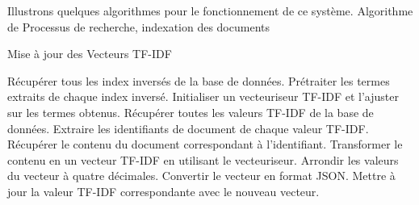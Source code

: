 Illustrons quelques algorithmes pour le fonctionnement de ce système.
Algorithme de Processus de recherche, indexation des documents

\begin{algorithm}
    \caption{Mise à jour des Vecteurs TF-IDF}
    \begin{algorithmic}[1]
        \State Récupérer tous les index inversés de la base de données.
        \State Prétraiter les termes extraits de chaque index inversé.
        \State Initialiser un vecteuriseur TF-IDF et l'ajuster sur les termes obtenus.
        \State Récupérer toutes les valeurs TF-IDF de la base de données.
        \State Extraire les identifiants de document de chaque valeur TF-IDF.
            \State Récupérer le contenu du document correspondant à l'identifiant.
            \State Transformer le contenu en un vecteur TF-IDF en utilisant le vecteuriseur.
            \State Arrondir les valeurs du vecteur à quatre décimales.
            \State Convertir le vecteur en format JSON.
            \State Mettre à jour la valeur TF-IDF correspondante avec le nouveau vecteur.
        \EndFor
    \end{algorithmic}
\end{algorithm}


